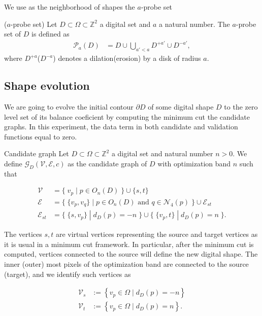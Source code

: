 \documentclass[runningheads]{llncs}
\newcommand{\daniel}[1]{ {\color{blue}#1} }
\newcommand{\Ds}{D}
\begin{document}
%
We use as the neighborhood of shapes the $a$-probe set
%
\begin{definition}{($a$-probe set)}
	Let $\Ds \subset \Omega \subset \mathbb{Z}^2$ a digital set and $a$ a natural number. The $a$-probe set of $\Ds$ is defined as
	\begin{align*}
		\mathcal{P}_a(\Ds) &= \Ds \cup \bigcup_{a' < a}{\Ds^{+a'} \cup \Ds^{-a'}},
	\end{align*}
	where $\Ds^{+a}$($\Ds^{-a}$) denotes a dilation(erosion) by a disk of radius $a$.
\end{definition}
%

\daniel{
\subsection{Shape evolution}
We are going to evolve the initial contour $\partial D$ of some digital shape $D$ to the zero level set of its balance coeficient by computing the minimum cut the candidate graphs. In this experiment, the data term in both candidate and validation functions equal to zero.}
%
\begin{definition}{Candidate graph}
Let $D \subset \Omega \subset \mathbb{Z}^2$ a digital set and natural number $n>0$. We define $\mathcal{G}_D(\mathcal{V},\mathcal{E},c)$ as the candidate graph of $D$ with optimization band $n$ such that

\begin{align*}
\mathcal{V} &= \big\{\; v_p \; | \; p \in O_n(D) \;\} \cup \{s,t \big\} \\
\mathcal{E} &= \big\{ \; \{v_p,v_q\} \; | \; p \in O_n(D) \text{ and } q \in \mathcal{N}_4(p) \; \big\} \cup \mathcal{E}_{st}\\
\mathcal{E}_{st} &= \big\{\; \{s,v_p\} \; | \; d_D(p)=-n \; \big\} \cup \big\{\; \{v_p,t\} \; | \; d_D(p)=n \; \big\}.
\end{align*}

\end{definition}

The vertices $s,t$ are virtual vertices representing the source and target vertices as it is usual in a minimum cut framework. In particular, after the minimum cut is computed, vertices connected to the source will define the new digital shape. The inner (outer) most pixels of the optimization band are connected to the source (target), and we identify such vertices as

\begin{align*}
	\mathcal{V}_s &:=\left\{ v_p \in \Omega \; | \; d_{D}(p) = -n \right\} \\
	\mathcal{V}_t &:=\left\{ v_p \in \Omega \; | \; d_{D}(p) = n \right\}.
\end{align*}
\end{document}
